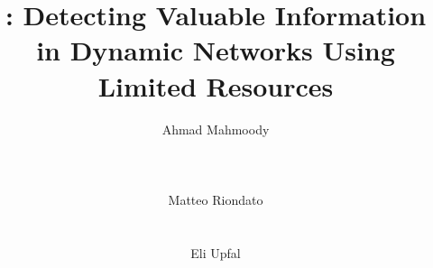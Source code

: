 \documentclass{sig-alternate}
\newif\ifacmstyle
\begin{document}
\ifacmstyle
\newfont{\mycrnotice}{ptmr8t at 7pt}
\newfont{\myconfname}{ptmri8t at 7pt}
\let\crnotice\mycrnotice%
\let\confname\myconfname%

\global\boilerplate={Permission to make digital or hard copies of all or part of
	this work for personal or classroom use is granted without fee provided that
	copies are not made or distributed for profit or commercial advantage and
	that copies bear this notice and the full citation on the first page.
	Copyrights for components of this work owned by others than the author(s)
	must be honored. Abstracting with credit is permitted. To copy otherwise, or
	republish, to post on servers or to redistribute to lists, requires prior
	specific permission and/or a fee. Request permissions from
Permissions@acm.org.}
\CopyrightYear{2016}
\conferenceinfo{WSDM 2016,}{February 22--25, 2016, San Francisco, CA, USA}
\copyrightetc{Copyright is held by the owner/author(s). Publication rights
licensed to ACM.\\ ISBN \the\acmcopyr}
\crdata{978-1-4503-3716-8/16/02\dots\$15.00\\
DOI: http://dx.doi.org/10.1145/2835776.2835830
}



\clubpenalty=10000
\widowpenalty = 10000
\fi

\title{\algonamebasecap: Detecting Valuable Information\\in Dynamic Networks Using Limited Resources}

\author{
\alignauthor
Ahmad Mahmoody\\
\\
\\
\\
\alignauthor
Matteo Riondato\\
\\
\\
\alignauthor
Eli Upfal\\
\\
\\
\\
}
\end{document}
